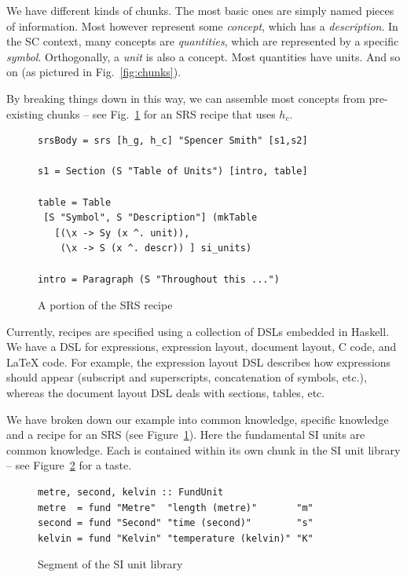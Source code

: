\documentclass{sig-alternate-05-2015}
\begin{document}
We have different kinds of chunks.  The most basic ones are simply named pieces
of information.  Most however represent some \emph{concept}, which has a
\emph{description}.  In the SC context, many concepts are \emph{quantities},
which are represented by a specific \emph{symbol}.  Orthogonally, a \emph{unit}
is also a concept.  Most quantities have units.  And so on (as pictured
in Fig.~\ref{fig:chunks}).

By breaking things down in this way, we can assemble most concepts from
pre-existing chunks -- see Fig.~\ref{fig:recipe} for an SRS recipe that
uses $h_c$.

\begin{figure}[tb]
\begin{lstlisting}[frame=single, 
  showstringspaces=false, basicstyle=\scriptsize]
srsBody = srs [h_g, h_c] "Spencer Smith" [s1,s2]

s1 = Section (S "Table of Units") [intro, table]

table = Table 
 [S "Symbol", S "Description"] (mkTable
   [(\x -> Sy (x ^. unit)),
    (\x -> S (x ^. descr)) ] si_units)

intro = Paragraph (S "Throughout this ...")
\end{lstlisting}
\caption{A portion of the SRS recipe}
\label{fig:recipe}
\end{figure}

Currently, recipes are specified using a collection of DSLs embedded in
Haskell.  We have a DSL for expressions, expression layout, document
layout, C code, and LaTeX code.  For example, the expression layout DSL
describes how expressions should appear (subscript and
superscripts, concatenation of symbols, etc.), whereas the document layout
DSL deals with sections, tables, etc.

We have broken down our example into common knowledge, specific knowledge
and a recipe for an SRS (see Figure~\ref{fig:recipe}).
Here the fundamental SI units are common knowledge. Each is
contained within its own chunk in the SI unit library -- see
Figure~\ref{fig:know_common} for a taste.

\begin{figure}[thb]
\begin{lstlisting}[frame=single, showstringspaces=false, 
  basicstyle=\scriptsize]
metre, second, kelvin :: FundUnit
metre  = fund "Metre"  "length (metre)"       "m"
second = fund "Second" "time (second)"        "s"
kelvin = fund "Kelvin" "temperature (kelvin)" "K"
\end{lstlisting}
\caption{Segment of the SI unit library}
\label{fig:know_common}
\end{figure}
\end{document}
